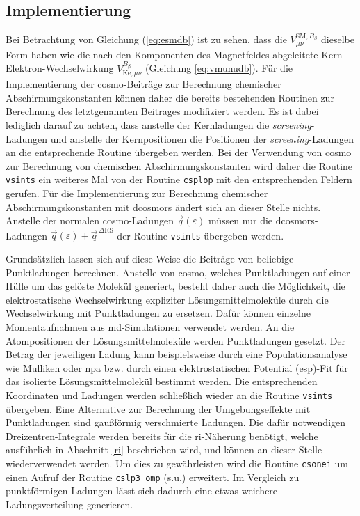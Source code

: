 	\subsection{Implementierung}\label{kap:cosmoimp}
	Bei Betrachtung von Gleichung (\ref{eq:esmdb}) ist zu sehen, dass die $V_{\mu\nu}^{\textrm{SM},B_\beta}$ dieselbe Form haben wie die nach den Komponenten des Magnetfeldes abgeleitete Kern-Elektron-Wechselwirkung $V_{\textrm{Ke},\mu\nu}^{B_\beta}$ (Gleichung \ref{eq:vmunudb}). Für die Implementierung der \ac{cosmo}-Beiträge zur Berechnung chemischer Abschirmungskonstanten können daher die bereits bestehenden Routinen zur Berechnung des letztgenannten Beitrages modifiziert werden. Es ist dabei lediglich darauf zu achten, dass anstelle der Kernladungen die \textit{screening}-Ladungen und anstelle der Kernpositionen die Positionen der \textit{screening}-Ladungen an die entsprechende Routine übergeben werden. Bei der Verwendung von \ac{cosmo} zur Berechnung von chemischen Abschirmungskonstanten wird daher die Routine \texttt{vsints} ein weiteres Mal von der Routine \texttt{csplop} mit den entsprechenden Feldern gerufen. Für die Implementierung zur Berechnung chemischer Abschirmungskonstanten mit \ac{dcosmors} ändert sich an dieser Stelle nichts. Anstelle der normalen \ac{cosmo}-Ladungen $\vec{q}(\varepsilon)$ müssen nur die \ac{dcosmors}-Ladungen $\vec{q}(\varepsilon)+\vec{q}^{\,\Delta\textrm{RS}}$ der Routine \texttt{vsints} übergeben werden.
	
Grundsätzlich lassen sich auf diese Weise die Beiträge von beliebige Punktladungen berechnen. Anstelle von \ac{cosmo}, welches Punktladungen auf einer Hülle um das gelöste Molekül generiert, besteht daher auch die Möglichkeit, die elektrostatische Wechselwirkung expliziter Lösungsmittelmoleküle durch die Wechselwirkung mit Punktladungen zu ersetzen. Dafür können einzelne Momentaufnahmen aus \ac{md}-Simulationen verwendet werden. An die Atompositionen der Lösungsmittelmoleküle werden Punktladungen gesetzt. Der Betrag der jeweiligen Ladung kann beispielsweise durch eine Populationsanalyse wie Mulliken\supercite{mulliken1955electronic} oder \ac{npa}\supercite{reed1985natural} bzw. durch einen elektrostatischen Potential (\acs{esp})-Fit\supercite{singh1984approach} für das isolierte Lösungsmittelmolekül bestimmt werden. Die entsprechenden Koordinaten und Ladungen werden schließlich wieder an die Routine \texttt{vsints} übergeben. Eine Alternative zur Berechnung der Umgebungseffekte mit Punktladungen sind gaußförmig verschmierte Ladungen. Die dafür notwendigen Dreizentren-Integrale werden bereits für die \ac{ri}-Näherung benötigt, welche ausführlich in Abschnitt \ref{ri} beschrieben wird, und können an dieser Stelle wiederverwendet werden. Um dies zu gewährleisten wird die Routine \texttt{csonei} um einen Aufruf der Routine \texttt{cslp3\_omp} (s.u.) erweitert. Im Vergleich zu punktförmigen Ladungen lässt sich dadurch eine etwas weichere Ladungsverteilung generieren. 

